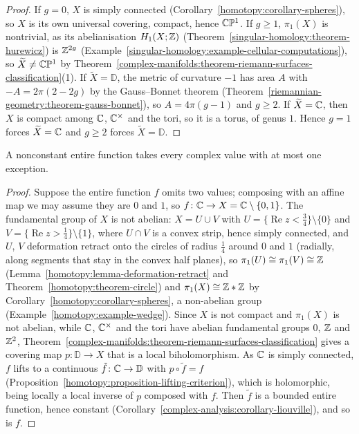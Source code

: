 \begin{proof}
If $g = 0$, $X$ is simply connected (Corollary~\ref{homotopy:corollary-spheres}), so $X$ is its own universal covering, compact, hence $\mathbb{C}\mathbb{P}^1$. If $g \geq 1$, $\pi_1(X)$ is
nontrivial, as its abelianisation $H_1(X; \mathbb{Z})$ (Theorem~\ref{singular-homology:theorem-hurewicz}) is $\mathbb{Z}^{2g}$
(Example~\ref{singular-homology:example-cellular-computations}), so $\widetilde{X} \neq \mathbb{C}\mathbb{P}^1$ by
Theorem~\ref{complex-manifolds:theorem-riemann-surfaces-classification}(1). If $\widetilde{X} = \mathbb{D}$, the metric of curvature $-1$ has area $A$ with $-A = 2\pi(2 - 2g)$ by
the Gauss--Bonnet theorem (Theorem~\ref{riemannian-geometry:theorem-gauss-bonnet}), so $A = 4\pi(g - 1)$ and $g \geq 2$. If $\widetilde{X} = \mathbb{C}$, then $X$ is compact among
$\mathbb{C}$, $\mathbb{C}^\times$ and the tori, so it is a torus, of genus $1$. Hence $g = 1$ forces $\widetilde{X} = \mathbb{C}$ and $g \geq 2$ forces $\widetilde{X} = \mathbb{D}$.
\end{proof}

\begin{corollary}\label{complex-manifolds:corollary-picard}
A nonconstant entire function takes every complex value with at most one exception.
\end{corollary}

\begin{proof}
Suppose the entire function $f$ omits two values; composing with an affine map we may assume they are $0$ and $1$, so $f \colon \mathbb{C} \to X = \mathbb{C} \setminus \{0, 1\}$. The fundamental
group of $X$ is not abelian: $X = U \cup V$ with $U = \{\operatorname{Re}z < \frac34\} \setminus \{0\}$ and $V = \{\operatorname{Re}z > \frac14\} \setminus \{1\}$, where
$U \cap V$ is a convex strip, hence simply connected, and $U$, $V$ deformation retract onto the circles of radius $\frac14$ around $0$ and $1$ (radially, along segments
that stay in the convex half planes), so $\pi_1(U) \cong \pi_1(V) \cong \mathbb{Z}$ (Lemma~\ref{homotopy:lemma-deformation-retract} and Theorem~\ref{homotopy:theorem-circle}) and
$\pi_1(X) \cong \mathbb{Z} * \mathbb{Z}$ by Corollary~\ref{homotopy:corollary-spheres}, a non-abelian group (Example~\ref{homotopy:example-wedge}). Since $X$ is not compact and $\pi_1(X)$ is not abelian, while
$\mathbb{C}$, $\mathbb{C}^\times$ and the tori have abelian fundamental groups $0$, $\mathbb{Z}$ and $\mathbb{Z}^2$, Theorem~\ref{complex-manifolds:theorem-riemann-surfaces-classification} gives a covering
map $p \colon \mathbb{D} \to X$ that is a local biholomorphism. As $\mathbb{C}$ is simply connected, $f$ lifts to a continuous $\tilde f \colon \mathbb{C} \to \mathbb{D}$ with $p \circ \tilde f = f$
(Proposition~\ref{homotopy:proposition-lifting-criterion}), which is holomorphic, being locally a local inverse of $p$ composed with $f$. Then $\tilde f$ is a bounded entire function,
hence constant (Corollary~\ref{complex-analysis:corollary-liouville}), and so is $f$.
\end{proof}

